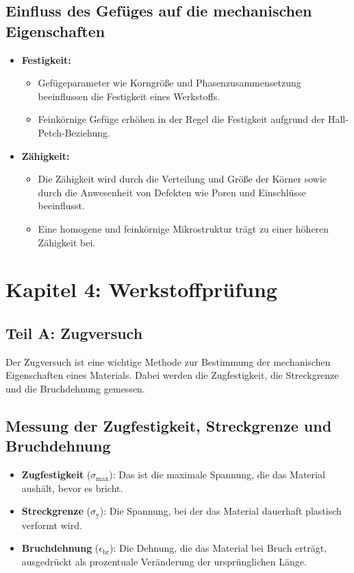 \documentclass[a4paper,12pt]{article}
\begin{document}
\subsection{Einfluss des Gefüges auf die mechanischen Eigenschaften}
\begin{itemize}
    \item \textbf{Festigkeit:}
    \begin{itemize}
        \item Gefügeparameter wie Korngröße und Phasenzusammensetzung beeinflussen die Festigkeit eines Werkstoffs.
        \item Feinkörnige Gefüge erhöhen in der Regel die Festigkeit aufgrund der Hall-Petch-Beziehung.
    \end{itemize}
    \item \textbf{Zähigkeit:}
    \begin{itemize}
        \item Die Zähigkeit wird durch die Verteilung und Größe der Körner sowie durch die Anwesenheit von Defekten wie Poren und Einschlüsse beeinflusst.
        \item Eine homogene und feinkörnige Mikrostruktur trägt zu einer höheren Zähigkeit bei.
    \end{itemize}
\end{itemize}

\newpage

\section{Kapitel 4: Werkstoffprüfung}

\subsection{Teil A: Zugversuch}

Der Zugversuch ist eine wichtige Methode zur Bestimmung der mechanischen Eigenschaften eines Materials. Dabei werden die Zugfestigkeit, die Streckgrenze und die Bruchdehnung gemessen. 

\subsection{Messung der Zugfestigkeit, Streckgrenze und Bruchdehnung}

\begin{itemize}
    \item \textbf{Zugfestigkeit} ($\sigma_{\text{max}}$): Das ist die maximale Spannung, die das Material aushält, bevor es bricht.
    \item \textbf{Streckgrenze} ($\sigma_{\text{y}}$): Die Spannung, bei der das Material dauerhaft plastisch verformt wird.
    \item \textbf{Bruchdehnung} ($\epsilon_{\text{br}}$): Die Dehnung, die das Material bei Bruch erträgt, ausgedrückt als prozentuale Veränderung der ursprünglichen Länge.
\end{itemize}
\end{document}
